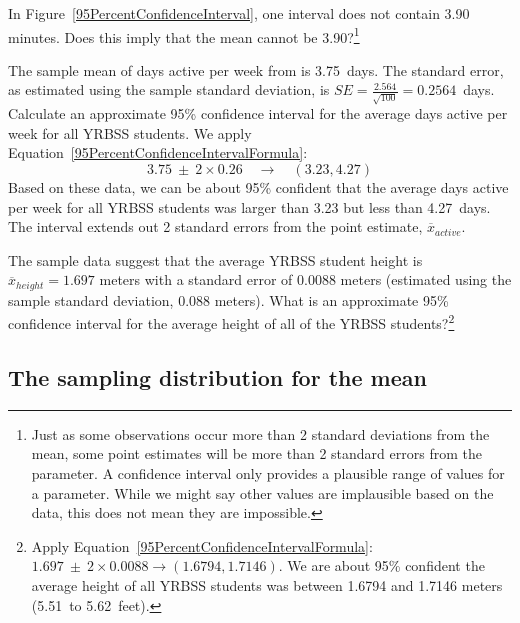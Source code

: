 \begin{spacing}{1.5}
\begin{exercise}
In Figure~\ref{95PercentConfidenceInterval}, one interval does not contain 3.90 minutes. Does this imply that the mean cannot be 3.90?\footnote{Just as some observations occur more than 2 standard deviations from the mean, some point estimates will be more than 2 standard errors from the parameter. A confidence interval only provides a plausible range of values for a parameter. While we might say other values are implausible based on the data, this does not mean they are impossible.}
\end{exercise}

\begin{example}{The sample mean of days active per week from  is 3.75~days. The standard error, as estimated using the sample standard deviation, is $SE=\frac{2.564}{\sqrt{100}} = 0.2564$~days. Calculate an approximate 95\% confidence interval for the average days active per week for all YRBSS students.}
We apply Equation~\ref{95PercentConfidenceIntervalFormula}:
\[3.75\ \pm\ 2 \times  0.26 \quad \rightarrow \quad (3.23, 4.27)\]
Based on these data, we can be about 95\% confident that the average days active per week for all YRBSS students was larger than 3.23 but less than 4.27~days. The interval extends out 2 standard errors from the point estimate, $\overline{x}_{active}$.
\end{example}

\begin{exercise} \label{95CIExerciseForAgeOfYrbssSamp1}
The sample data suggest that the average YRBSS student height is $\overline{x}_{height} = 1.697$ meters with a standard error of 0.0088 meters (estimated using the sample standard deviation, 0.088 meters). What is an approximate 95\% confidence interval for the average height of all of the YRBSS students?\footnote{Apply Equation~\ref{95PercentConfidenceIntervalFormula}: $1.697 \ \pm \ 2\times 0.0088 \rightarrow (1.6794, 1.7146)$.  We are about 95\% confident the average height of all YRBSS students was between 1.6794 and 1.7146 meters (5.51~to 5.62~feet).}
\end{exercise}

\subsection{The sampling distribution for the mean}


\end{spacing}
